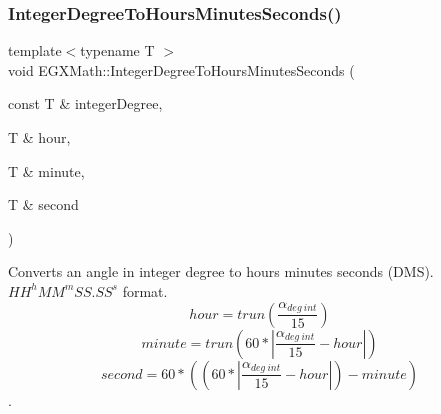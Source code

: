 \subsubsection{\texorpdfstring{Integer\+Degree\+To\+Hours\+Minutes\+Seconds()}{IntegerDegreeToHoursMinutesSeconds()}}
{\footnotesize\ttfamily template$<$typename T $>$ \\
void E\+G\+X\+Math\+::\+Integer\+Degree\+To\+Hours\+Minutes\+Seconds (\begin{DoxyParamCaption}\item[{const T \&}]{integer\+Degree,  }\item[{T \&}]{hour,  }\item[{T \&}]{minute,  }\item[{T \&}]{second }\end{DoxyParamCaption})}



Converts an angle in integer degree to hours minutes seconds (D\+MS). ${HH}^{h}{MM}^{m}{SS.SS}^{s}$ format. \[hour=trun(\frac{\alpha_{deg\ int}}{15})\] \[minute=trun(60 * |\frac{\alpha_{deg\ int}}{15} - hour|)\] \[second=60 * ((60 * |\frac{\alpha_{deg\ int}}{15} - hour|)-minute)\]. 

